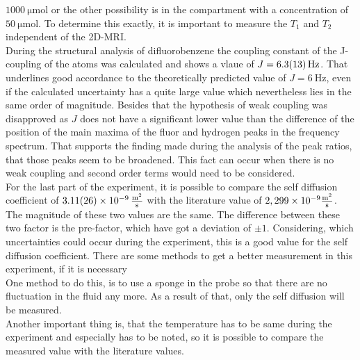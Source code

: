 $\SI{1000}{\micro\mole}$ or the other possibility is  in the compartment with a concentration of $\SI{50}{\micro\mole}$. To determine this exactly, it is important to measure the $T_1$ and $T_2$ independent of the 2D-MRI.  \\
During the structural analysis of difluorobenzene the coupling constant of the J-coupling of the atoms was calculated and shows a vlaue of $J = \SI{6.3 \pm 1.3}{\hertz}$.
That underlines good accordance to the theoretically predicted value of $J= \SI{6}{\hertz}$, even if the calculated uncertainty has a quite large value which nevertheless lies in the same order of magnitude.
Besides that the hypothesis of weak coupling was disapproved as $J$ does not have a significant lower value than the difference of the position of the main maxima of the fluor and hydrogen peaks in the frequency spectrum.
That supports the finding made during the analysis of the peak ratios, that those peaks seem to be broadened. 
This fact can occur when there is no weak coupling and second order terms would need to be considered.\\
For the last part of the experiment, it is possible to compare the self diffusion coefficient of $\SI{3,11(26)e-9}{\frac{\m^2}{s}}$ with the literature value of $2,299\times  10^{-9}\si{\frac{\m^2}{\s}}$. The magnitude of these two values are the same. The difference between these two factor is the pre-factor, which have got a deviation of $\pm1$. Considering, which uncertainties could occur during the experiment, this is a good value for the self diffusion coefficient. There are some methods to get a better measurement in this experiment, if it is necessary \\  
One method to do this, is to use a sponge in the probe so that there are no fluctuation in the fluid any more. As a result of that, only the self diffusion will be measured.\\
Another important thing is, that the temperature has to be same during the experiment and especially has to be noted, so it is possible to compare the measured value with the literature values. 